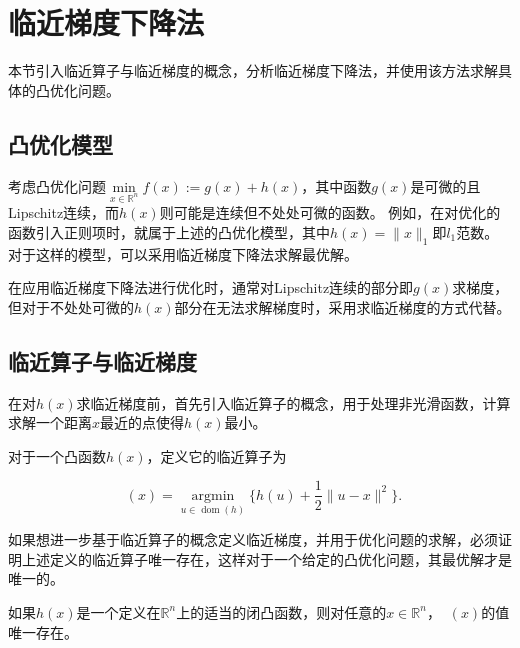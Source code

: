 \section{临近梯度下降法}

本节引入临近算子与临近梯度的概念，分析临近梯度下降法，并使用该方法求解具体的凸优化问题。

\subsection{凸优化模型}

考虑凸优化问题$\min\limits_{x\in \mathbb{R}^{n}} f(x) := g(x) + h(x)$，其中函数$g(x)$是可微的且Lipschitz连续，而$h(x)$则可能是连续但不处处可微的函数。
例如，在对优化的函数引入正则项时，就属于上述的凸优化模型，其中$h(x)=\|x\|_{1}$即$l_{1}$范数。对于这样的模型，可以采用临近梯度下降法求解最优解。

在应用临近梯度下降法进行优化时，通常对Lipschitz连续的部分即$g(x)$求梯度，但对于不处处可微的$h(x)$部分在无法求解梯度时，采用求临近梯度的方式代替。

\subsection{临近算子与临近梯度}

在对$h(x)$求临近梯度\cite{2014Prox}前，首先引入临近算子的概念，用于处理非光滑函数，计算求解一个距离$x$最近的点使得$h(x)$最小。

\begin{definition}\label{def_prox_1}
    对于一个凸函数$h(x)$，定义它的临近算子为

    \begin{equation}
        \mathop{\mathrm{prox_{h}}}(x) = \mathop{\mathrm{argmin}}\limits_{u\in \mathop{\mathrm{dom}} (h)}\{h(u)+\frac{1}{2}\|u-x\|^{2}\}.
    \end{equation}

\end{definition}

如果想进一步基于临近算子的概念定义临近梯度，并用于优化问题的求解，必须证明上述定义的临近算子唯一存在，这样对于一个给定的凸优化问题，其最优解才是唯一的。

\begin{theorem}\label{thm_prox_1}
    如果$h(x)$是一个定义在$\mathbb{R}^{n}$上的适当的闭凸函数，则对任意的$x\in \mathbb{R}^{n}$，$\mathop{\mathrm{prox_{h}}}(x)$的值唯一存在。
\end{theorem}

